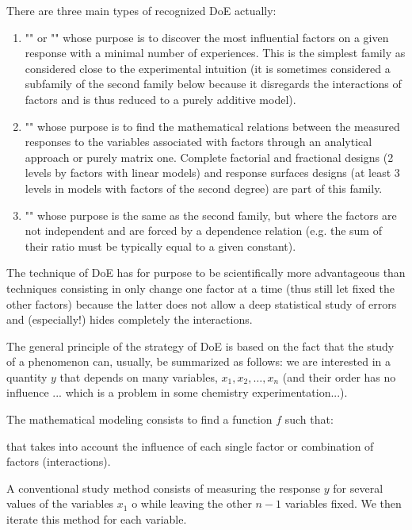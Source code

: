 	There are three main types of recognized DoE actually:
	\begin{enumerate}
		\item ""  or "" whose purpose is to discover the most influential factors on a given response with a minimal number of experiences. This is the simplest family as considered close to the experimental intuition (it is sometimes considered a subfamily of the second family below because it disregards the interactions of factors and is thus reduced to a purely additive model).
		
		\item "" whose purpose is to find the mathematical relations between the measured responses to the variables associated with factors through an analytical approach or purely matrix one. Complete factorial and fractional designs (2 levels by factors with linear models) and response surfaces designs (at least 3 levels in models with factors of the second degree) are part of this family.
		
		\item "" whose purpose is the same as the second family, but where the factors are not independent and are forced by a dependence relation (e.g. the sum of their ratio must be typically equal to a given constant).
	\end{enumerate}
	The technique of DoE has for purpose to be scientifically more advantageous than techniques consisting in only change one factor at a time (thus still let fixed the other factors) because the latter does not allow a deep statistical study of errors and (especially!) hides completely the interactions.
	
	The general principle of the strategy of DoE is based on the fact that the study of a phenomenon can, usually, be summarized as follows: we are interested in a quantity $y$ that depends on many variables, $x_1,x_2,…,x_n$ (and their order has no influence ... which is a problem in some chemistry experimentation...).
	
	The mathematical modeling consists to find a function $f$ such that:
	
	that takes into account the influence of each single factor or combination of factors (interactions). 
	
	A conventional study method consists of measuring the response $y$ for several values of the variables $x_1$ o while leaving the other $n-1$ variables fixed. We then iterate this method for each variable.
	
